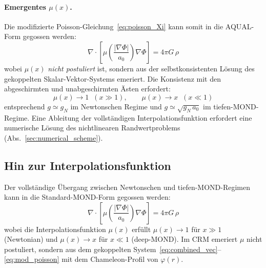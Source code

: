 \documentclass[aps,prd,twocolumn,superscriptaddress,nofootinbib]{revtex4-2}
\begin{document}
\paragraph{Emergentes $\mu(x)$.}
Die modifizierte Poisson-Gleichung~\eqref{eq:poisson_Xi} kann somit in die AQUAL-Form gegossen werden:
\begin{equation}
\nabla\!\cdot\!\left[\mu\!\left(\frac{|\nabla\Phi|}{a_0}\right)\nabla\Phi\right] = 4\pi G\,\rho
\label{eq:aqual_emergent}
\end{equation}
wobei $\mu(x)$ \textit{nicht postuliert} ist, sondern aus der selbstkonsistenten L\"osung des gekoppelten Skalar-Vektor-Systems emeriert. Die Konsistenz mit den abgeschirmten und unabgeschirmten \"Asten erfordert:
\begin{equation}
\mu(x) \to 1 \;\;(x \gg 1), \qquad \mu(x) \to x \;\;(x \ll 1)
\label{eq:mu_limits}
\end{equation}
entsprechend $g \simeq g_N$ im Newtonschen Regime und $g \simeq \sqrt{g_N\,a_0}$ im tiefen-MOND-Regime. Eine Ableitung der vollst\"andigen Interpolationsfunktion erfordert eine numerische L\"osung des nichtlinearen Randwertproblems (Abs.~\ref{sec:numerical_scheme}).

\subsection{Hin zur Interpolationsfunktion}
\label{sec:interpolation}

Der vollst\"andige \"Ubergang zwischen Newtonschen und tiefen-MOND-Regimen kann in die Standard-MOND-Form gegossen werden:
\begin{equation}
\nabla\cdot\!\left[\mu\!\left(\frac{|\nabla\Phi|}{a_0}\right)\nabla\Phi\right] = 4\pi G\,\rho
\label{eq:mond_form}
\end{equation}
wobei die Interpolationsfunktion $\mu(x)$ erf\"ullt $\mu(x) \to 1$ f\"ur $x \gg 1$ (Newtonian) und $\mu(x) \to x$ f\"ur $x \ll 1$ (deep-MOND). Im CRM emeriert $\mu$ nicht postuliert, sondern aus dem gekoppelten System~\eqref{eq:combined_vec}--\eqref{eq:mod_poisson} mit dem Chameleon-Profil von $\varphi(r)$.
\end{document}
